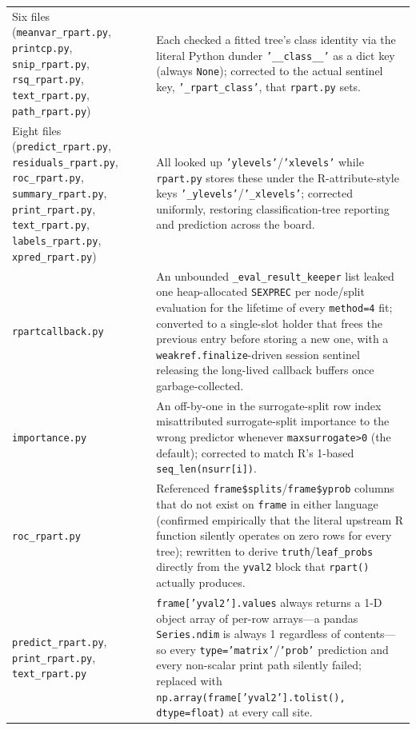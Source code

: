 \documentclass[12pt]{article}
\begin{document}
\begin{longtable}{p{2.6cm}p{9.9cm}}
Six files (\texttt{meanvar\_rpart.py}, \texttt{printcp.py}, \texttt{snip\_rpart.py}, \texttt{rsq\_rpart.py}, \texttt{text\_rpart.py}, \texttt{path\_rpart.py}) & Each checked a fitted tree's class identity via the literal Python dunder \texttt{'\_\_class\_\_'} as a dict key (always \texttt{None}); corrected to the actual sentinel key, \texttt{'\_rpart\_class'}, that \texttt{rpart.py} sets. \\
Eight files (\texttt{predict\_rpart.py}, \texttt{residuals\_rpart.py}, \texttt{roc\_rpart.py}, \texttt{summary\_rpart.py}, \texttt{print\_rpart.py}, \texttt{text\_rpart.py}, \texttt{labels\_rpart.py}, \texttt{xpred\_rpart.py}) & All looked up \texttt{'ylevels'}/\texttt{'xlevels'} while \texttt{rpart.py} stores these under the R-attribute-style keys \texttt{'\_ylevels'}/\texttt{'\_xlevels'}; corrected uniformly, restoring classification-tree reporting and prediction across the board. \\
\texttt{rpartcallback.py} & An unbounded \texttt{\_eval\_result\_keeper} list leaked one heap-allocated \texttt{SEXPREC} per node/split evaluation for the lifetime of every \texttt{method=4} fit; converted to a single-slot holder that frees the previous entry before storing a new one, with a \texttt{weakref.finalize}-driven session sentinel releasing the long-lived callback buffers once garbage-collected. \\
\texttt{importance.py} & An off-by-one in the surrogate-split row index misattributed surrogate-split importance to the wrong predictor whenever \texttt{maxsurrogate>0} (the default); corrected to match R's 1-based \texttt{seq\_len(nsurr[i])}. \\
\texttt{roc\_rpart.py} & Referenced \texttt{frame\$splits}/\texttt{frame\$yprob} columns that do not exist on \texttt{frame} in either language (confirmed empirically that the literal upstream R function silently operates on zero rows for every tree); rewritten to derive \texttt{truth}/\texttt{leaf\_probs} directly from the \texttt{yval2} block that \texttt{rpart()} actually produces. \\
\texttt{predict\_rpart.py}, \texttt{print\_rpart.py}, \texttt{text\_rpart.py} & \texttt{frame['yval2'].values} always returns a 1-D object array of per-row arrays---a pandas \texttt{Series.ndim} is always 1 regardless of contents---so every \texttt{type='matrix'}/\texttt{'prob'} prediction and every non-scalar print path silently failed; replaced with \texttt{np.array(frame['yval2'].tolist(), dtype=float)} at every call site. \\

\end{longtable}
\end{document}
